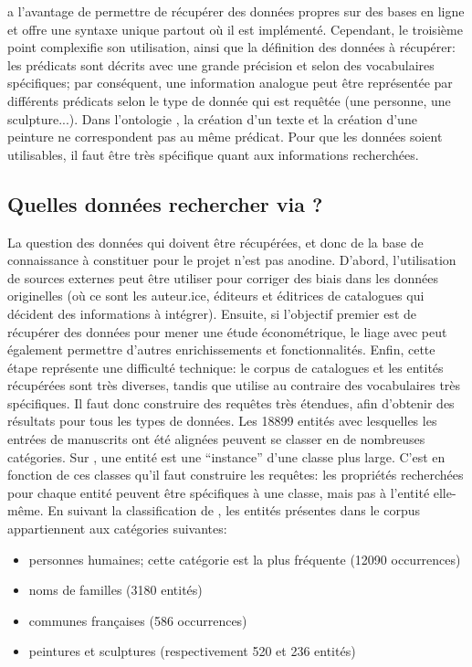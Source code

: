 \sparql{} a l'avantage de permettre de récupérer des données propres sur des bases en ligne et offre une syntaxe unique partout où il est implémenté. Cependant, le troisième point complexifie son utilisation, ainsi que la définition des données à récupérer: les prédicats sont décrits avec une grande précision et selon des vocabulaires spécifiques; par conséquent, une information analogue peut être représentée par différents prédicats selon le type de donnée qui est requêtée (une personne, une sculpture...). Dans l'ontologie \wkd{}, la création d'un texte et la création d'une peinture ne correspondent pas au même prédicat. Pour que les données soient utilisables, il faut être très spécifique quant aux informations recherchées. 

\subsection{Quelles données rechercher via \sparql?}
La question des données qui doivent être récupérées, et donc de la base de connaissance à constituer pour le projet \mssktb{} n'est pas anodine. D'abord, l'utilisation de sources externes peut être utiliser pour corriger des biais dans les données originelles (où ce sont les auteur.ice, éditeurs et éditrices de catalogues qui décident des informations à intégrer). Ensuite, si l'objectif premier est de récupérer des données pour mener une étude économétrique, le liage avec \wkd{} peut également permettre d'autres enrichissements et fonctionnalités. Enfin, cette étape représente une difficulté technique: le corpus de catalogues et les entités récupérées sont très diverses, tandis que \sparql{} utilise au contraire des vocabulaires très spécifiques. Il faut donc construire des requêtes très étendues, afin d'obtenir des résultats pour tous les types de données. Les 18899 entités avec lesquelles les entrées de manuscrits ont été alignées peuvent se classer en de nombreuses catégories. Sur \wkd{}, une entité est une \enquote{instance} d'une classe plus large. C'est en fonction de ces classes qu'il faut construire les requêtes: les propriétés recherchées pour chaque entité peuvent être spécifiques à une classe, mais pas à l'entité elle-même. En suivant la classification de \wkd{}, les entités présentes dans le corpus appartiennent aux catégories suivantes:

\begin{itemize}
	\item personnes humaines; cette catégorie est la plus fréquente (12090 occurrences)
	\item noms de familles (3180 entités)
	\item communes françaises (586 occurrences)
	\item peintures et sculptures (respectivement 520 et 236 entités)
\end{itemize}

